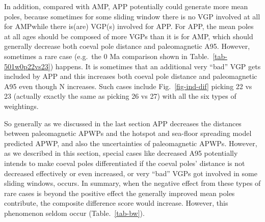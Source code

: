 In addition, compared with AMP, APP potentially could generate more mean poles,
because sometimes for some sliding window there is no VGP involved at all for
AMP\@ while there is(are) VGP(s) involved for APP\@. For APP, the mean poles at
all ages should be composed of more VGPs than it is for AMP, which should
generally decrease both coeval pole distance and paleomagnetic A95. However,
sometimes a rare case (e.g.\ the 0 Ma comparison shown in
Table.~\ref{tab-501w0p22vs23}) happens. It is sometimes that an additional
very ``bad'' VGP gets included by APP and this increases both coeval pole
distance and paleomagnetic A95 even though N increases. Such cases include
Fig.~\ref{fig-ind-dif} picking 22 vs 23 (actually exactly the same as picking 26
vs 27) with all the six types of weightings.

So generally as we discussed in the last section APP decreases the distances
between paleomagnetic APWPs and the hotspot and sea-floor spreading model
predicted APWP, and also the uncertainties of paleomagnetic APWPs. However, as
we described in this section, special cases like decreased A95 potentially
intends to make coeval poles differentiated if the coeval poles' distance is
not decreased effectively or even increased, or very ``bad'' VGPs got involved
in some sliding windows, occurs. In summary, when the negative effect from
these types of rare cases is beyond the positive effect the generally improved
mean poles contribute, the composite difference score would increase. However,
this phenomenon seldom occur (Table.~\ref{tab-bw}).


